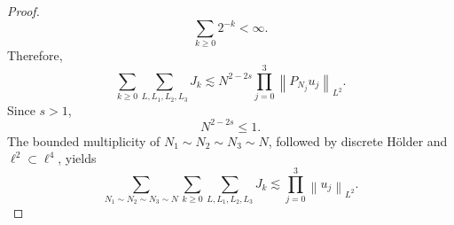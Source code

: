 \documentclass[12pt,oneside,reqno]{amsart}
\numberwithin{equation}{section}
\theoremstyle{plain}
\newcommand{\Lpn}[2]{%
    \left\lVert #1\right\rVert_{L^{#2}}%
}
\newcommand{\Ls}{{L,L_1,L_2,L_3}}
\begin{document}
\begin{proof}
\begin{equation}
    \sum_{k\geq0}2^{-k}<\infty.
\end{equation}
Therefore,
\begin{equation}
\label{eq:case6-small-xi-summed}
    \sum_{k\geq0}
    \sum_{\Ls}J_k
    \lesssim
    N^{2-2s}
    \prod_{j=0}^3
    \Lpn{P_{N_j}u_j}{2}.
\end{equation}
Since $s>1$,
\begin{equation}
    N^{2-2s}\leq1.
\end{equation}
The bounded multiplicity of
$N_1\sim N_2\sim N_3\sim N$, followed by discrete H\"older and
$\ell^2\subset\ell^4$, yields
\begin{equation}
\label{eq:case6-small-xi-final}
    \sum_{N_1\sim N_2\sim N_3\sim N}
    \sum_{k\geq0}
    \sum_{\Ls}
    J_k
    \lesssim
    \prod_{j=0}^3
    \Lpn{u_j}{2}.
\end{equation}


\end{proof}
\end{document}
